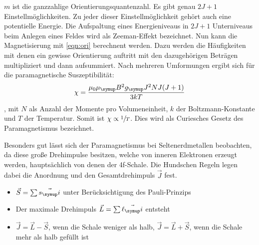 $m$ ist die ganzzahlige Orientierungsquantenzahl. Es gibt genau $2J+1$
Einstellmöglichkeiten. Zu jeder dieser Einstellmöglichkeit gehört auch eine
potentielle Energie. Die Aufspaltung eines Energieniveaus in $2J+1$ Unterniveaus
beim Anlegen eines Feldes wird als Zeeman-Effekt bezeichnet.
Nun kann die Magnetisierung mit \eqref{eqn:ori} berechnent werden. Dazu werden
die Häufigkeiten mit denen ein gewisse Orientierung auftritt mit den dazugehörigen
Beträgen multipliziert und dann aufsummiert. Nach mehreren Umformungen ergibt
sich für die paramagnetische Suszeptibilität:
\begin{equation}
  \chi = \frac{\mu_0 \mu_\su{B}^2 g_\su{J}^2 N J(J+1)}{3kT}
\end{equation}
, mit $N$ als Anzahl der Momente pro Volumeneinheit, $k$ der Boltzmann-Konstante
 und $T$ der Temperatur. Somit ist $\chi \propto \sfrac{1}{T}$. Dies wird als Curiesches
 Gesetz des Paramagnetismus bezeichnet.

 Besonders gut lässt sich der Paramagnetismus bei Seltenerdmetallen beobachten,
 da diese große Drehimpulse besitzen, welche von inneren Elektronen erzeugt werden,
 hauptsächlich von denen der 4f-Schale. Die Hundschen Regeln legen dabei die
 Anordnung und den Gesamtdrehimpuls $\vec{J}$ fest.
 \begin{itemize}
   \item $\vec{S} = \sum \vec{s_\su{i}}$ unter Berücksichtigung des
   Pauli-Prinzips \\
   \item Der maximale Drehimpuls $\vec{L} = \sum \vec{\ell_\su{i}}$ entsteht \\
   \item $\vec{J} = \vec{L}-\vec{S}$, wenn die Schale weniger als halb,
   $\vec{J}= \vec{L}+\vec{S}$, wenn die Schale mehr als halb gefüllt ist \\
 \end{itemize}

